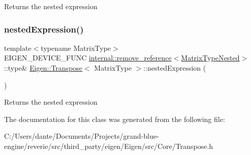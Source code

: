 \begin{DoxyReturn}{Returns}
the nested expression 
\end{DoxyReturn}
\mbox{\label{class_eigen_1_1_transpose_a3265292cf912f401a32eea99975e47ea}} 
\subsubsection{\texorpdfstring{nestedExpression()}{nestedExpression()}\hspace{0.1cm}{\footnotesize\ttfamily [2/2]}}
{\footnotesize\ttfamily template$<$typename Matrix\+Type$>$ \\
E\+I\+G\+E\+N\+\_\+\+D\+E\+V\+I\+C\+E\+\_\+\+F\+U\+NC \mbox{\hyperlink{struct_eigen_1_1internal_1_1remove__reference}{internal\+::remove\+\_\+reference}}$<$\mbox{\hyperlink{struct_eigen_1_1internal_1_1true__type}{Matrix\+Type\+Nested}}$>$\+::type\& \mbox{\hyperlink{class_eigen_1_1_transpose}{Eigen\+::\+Transpose}}$<$ Matrix\+Type $>$\+::nested\+Expression (\begin{DoxyParamCaption}{ }\end{DoxyParamCaption})\hspace{0.3cm}{\ttfamily [inline]}}

\begin{DoxyReturn}{Returns}
the nested expression 
\end{DoxyReturn}


The documentation for this class was generated from the following file\+:\begin{DoxyCompactItemize}
\item 
C\+:/\+Users/dante/\+Documents/\+Projects/grand-\/blue-\/engine/reverie/src/third\+\_\+party/eigen/\+Eigen/src/\+Core/Transpose.\+h\end{DoxyCompactItemize}
